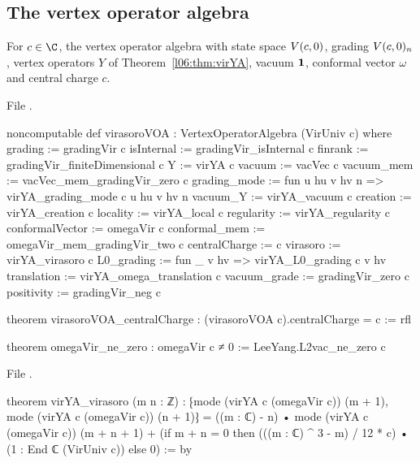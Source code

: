 \subsection{The vertex operator algebra}

\begin{definition}\label{l06:def:virVOA}
For $c\in\C$, the vertex operator algebra with state space $V(c,0)$, grading $V(c,0)_n$, vertex
operators $Y$ of Theorem~\ref{l06:thm:virYA}, vacuum $\mathbf{1}$, conformal vector $\omega$ and central
charge $c$.
\end{definition}

File .
\begin{leancode}
noncomputable def virasoroVOA : VertexOperatorAlgebra (VirUniv c) where
  grading := gradingVir c
  isInternal := gradingVir_isInternal c
  finrank := gradingVir_finiteDimensional c
  Y := virYA c
  vacuum := vacVec c
  vacuum_mem := vacVec_mem_gradingVir_zero c
  grading_mode := fun u hu v hv n => virYA_grading_mode c u hu v hv n
  vacuum_Y := virYA_vacuum c
  creation := virYA_creation c
  locality := virYA_local c
  regularity := virYA_regularity c
  conformalVector := omegaVir c
  conformal_mem := omegaVir_mem_gradingVir_two c
  centralCharge := c
  virasoro := virYA_virasoro c
  L0_grading := fun {_} v hv => virYA_L0_grading c v hv
  translation := virYA_omega_translation c
  vacuum_grade := gradingVir_zero c
  positivity := gradingVir_neg c

theorem virasoroVOA_centralCharge : (virasoroVOA c).centralCharge = c := rfl

theorem omegaVir_ne_zero : omegaVir c ≠ 0 := LeeYang.L2vac_ne_zero c
\end{leancode}
File .
\begin{leancode}
theorem virYA_virasoro (m n : ℤ) :
    ⁅mode (virYA c (omegaVir c)) (m + 1), mode (virYA c (omegaVir c)) (n + 1)⁆
      = ((m : ℂ) - n) • mode (virYA c (omegaVir c)) (m + n + 1)
        + (if m + n = 0 then (((m : ℂ) ^ 3 - m) / 12 * c) • (1 : End ℂ (VirUniv c)) else 0) := by
\end{leancode}

